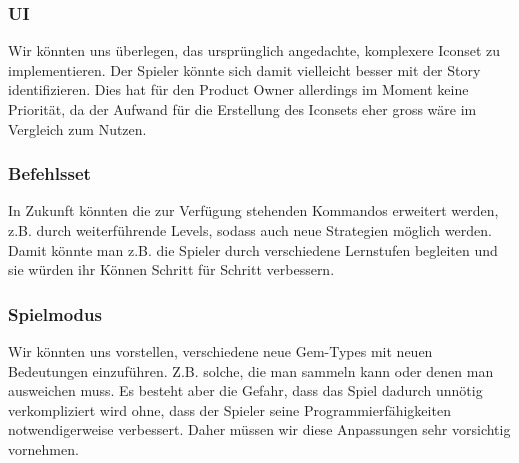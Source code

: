 \documentclass[11pt,a4paper,titlepage]{article}
\begin{document}
\subsubsection{UI}
Wir könnten uns überlegen, das ursprünglich angedachte, komplexere Iconset zu implementieren. Der Spieler könnte sich damit vielleicht besser mit der Story identifizieren. Dies hat für den Product Owner allerdings im Moment keine Priorität, da der Aufwand für die Erstellung des Iconsets eher gross wäre im Vergleich zum Nutzen.

\subsubsection{Befehlsset}
In Zukunft könnten die zur Verfügung stehenden Kommandos erweitert werden, z.B. durch weiterführende Levels, sodass auch neue Strategien möglich werden. Damit könnte man z.B. die Spieler durch verschiedene Lernstufen begleiten und sie würden ihr Können Schritt für Schritt verbessern.

\subsubsection{Spielmodus}
Wir könnten uns vorstellen, verschiedene neue Gem-Types mit neuen Bedeutungen einzuführen. Z.B. solche, die man sammeln kann oder denen man ausweichen muss. Es besteht aber die Gefahr, dass das Spiel dadurch unnötig verkompliziert wird ohne, dass der Spieler seine Programmierfähigkeiten notwendigerweise verbessert. Daher müssen wir diese Anpassungen sehr vorsichtig vornehmen.

\newpage



\begin{otherlanguage}{german}
\printbibliography
\end{otherlanguage}

\begin{otherlanguage}{german}
\listoffigures
\end{otherlanguage}
\end{document}
